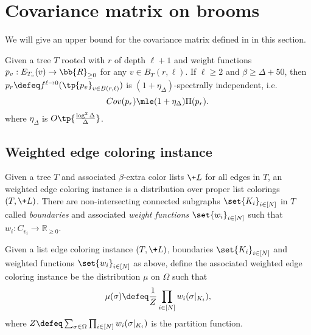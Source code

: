 
\section{Covariance matrix on brooms}\label{sec:covariance}
We will give an upper bound for the covariance matrix defined in  in this section.
\begin{lemma}\label{lem:SI-broom}
    Given a tree $T$ rooted with $r$ of depth $\ell+1$ and weight functions $\*p_v:E_{T_v}(v)\rightarrow \bb{R}_{\geq 0}$ for any $v\in B_T(r,\ell)$. If $\ell\geq 2$ and $\beta \geq \Delta + 50$, then $\*p_r\defeq  f^{\ell\rightarrow 0}(\tp{\*p_v}_{v\in B(r,\ell)})$ is $(1+\eta_\Delta)$-spectrally independent, i.e.
    \[
    \!{Cov}(\*p_r)\mle (1+\eta_{\Delta})\Pi(\*p_r).
    \]
    where $\eta_{\Delta}$ is $O\tp{\frac{\log^2 \Delta}{\Delta}}$.
\end{lemma}
\subsection{Weighted edge coloring instance}
\label{sec:weight-edge-coloring}
Given a tree $T$ and associated $\beta$-extra color lists $\+L$ for all edges in $T$, an weighted edge coloring instance is a distribution over proper list colorings $(T, \+L)$.
There are non-intersecting connected subgraphs $\set{K_i}_{i\in [N]}$ in $T$
called \emph{boundaries} and associated \emph{weight functions} $\set{w_i}_{i\in [N]}$
such that $w_i : C_{v_i} \to \mathbb R_{\ge 0}$.
\begin{definition}\label{def:weighted-coloring}    
    Given a list edge coloring instance $(T, \+L)$,
    boundaries $\set{K_i}_{i\in [N]}$
    and weighted functions $\set{w_i}_{i\in [N]}$
    as above, define the associated weighted edge coloring instance
    be the distribution $\mu$ on $\Omega$ such that
    \begin{align*}
        \mu(\sigma) \defeq \frac1Z \prod_{i\in [N]} w_i(\sigma|_{K_i}),
    \end{align*}
    where $Z\defeq \sum_{\sigma\in \Omega}\prod_{i\in [N]} w_i(\sigma|_{K_i})$
    is the partition function.
\end{definition}

